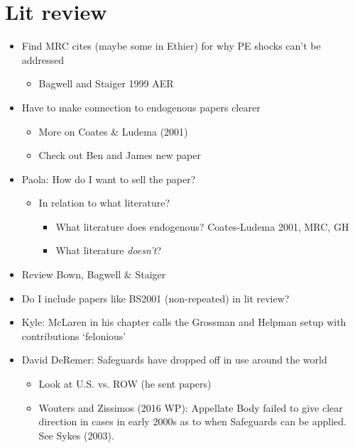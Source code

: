 \documentclass[12pt]{article}
\begin{document}
\section{Lit review}
\begin{itemize}
	\item Find MRC cites (maybe some in Ethier) for why PE shocks can't be addressed
		\begin{itemize}
			\item Bagwell and Staiger 1999 AER
		\end{itemize}
	\item Have to make connection to endogenous papers clearer
		\begin{itemize}
			\item More on Coates $\&$ Ludema (2001)
			\item Check out Ben and James new paper
		\end{itemize}
	\item Paola: How do I want to sell the paper?
		\begin{itemize}
			\item In relation to what literature?
				\begin{itemize}
					\item What literature does endogenous? Coates-Ludema 2001, MRC, GH
					\item What literature \textit{doesn't}?
				\end{itemize}
			\end{itemize}
	\item Review Bown, Bagwell $\&$ Staiger
	\item Do I include papers like BS2001 (non-repeated) in lit review?
	\item Kyle: McLaren in his chapter calls the Grossman and Helpman setup with
	 contributions `felonious'
	\item David DeRemer: Safeguards have dropped off in use around the world
		\begin{itemize}
			\item Look at U.S. vs. ROW (he sent papers)
			\item Wouters and Zissimos (2016 WP): Appellate Body failed to give clear direction in cases in early 2000s as to when Safeguards can be applied. See Sykes (2003).
		\end{itemize}
\end{itemize}
\end{document}
